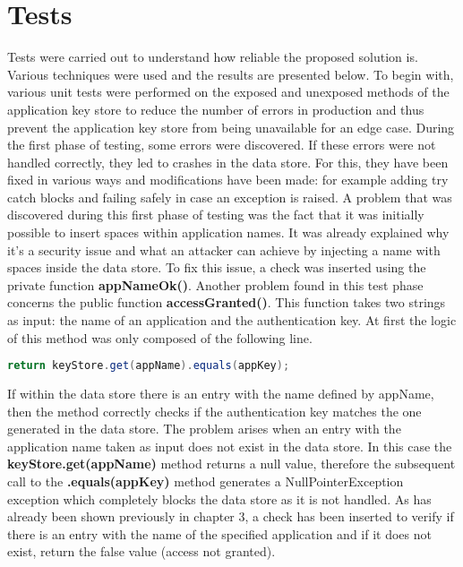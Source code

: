 \documentclass[a4paper,10pt]{memoir}
\begin{document}
\section{Tests}
Tests were carried out to understand how reliable the proposed solution is. Various techniques were used and the results are presented below. To begin with, various unit tests were performed on the exposed and unexposed methods of the application key store to reduce the number of errors in production and thus prevent the application key store from being unavailable for an edge case. During the first phase of testing, some errors were discovered. If these errors were not handled correctly, they led to crashes in the data store. For this, they have been fixed in various ways and modifications have been made: for example adding try catch blocks and failing safely in case an exception is raised. A problem that was discovered during this first phase of testing was the fact that it was initially possible to insert spaces within application names. It was already explained why it's a security issue and what an attacker can achieve by injecting a name with spaces inside the data store. To fix this issue, a check was inserted using the private function \textbf{appNameOk()}. Another problem found in this test phase concerns the public function \textbf{accessGranted()}. This function takes two strings as input: the name of an application and the authentication key. At first the logic of this method was only composed of the following line.
\begin{lstlisting}[language=java]
return keyStore.get(appName).equals(appKey);
\end{lstlisting}
If within the data store there is an entry with the name defined by appName, then the method correctly checks if the authentication key matches the one generated in the data store. The problem arises when an entry with the application name taken as input does not exist in the data store. In this case the \textbf{keyStore.get(appName)} method returns a null value, therefore the subsequent call to the \textbf{.equals(appKey)} method generates a NullPointerException exception which completely blocks the data store as it is not handled. As has already been shown previously in chapter 3, a check has been inserted to verify if there is an entry with the name of the specified application and if it does not exist, return the false value (access not granted). 
\end{document}
